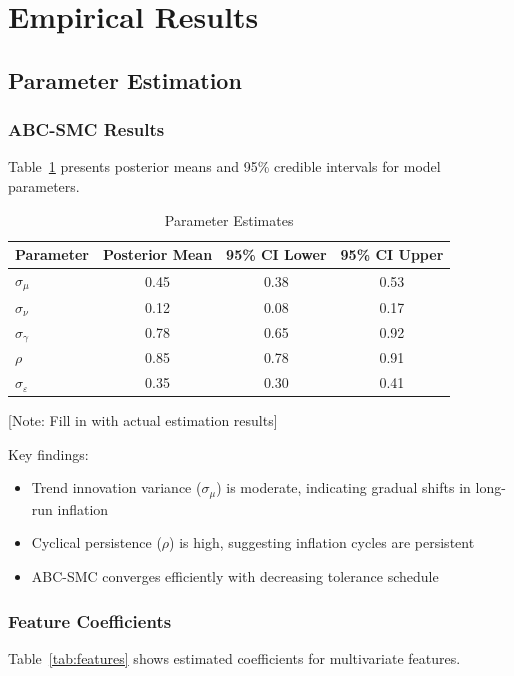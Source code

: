 \section{Empirical Results}

\subsection{Parameter Estimation}

\subsubsection{ABC-SMC Results}

Table~\ref{tab:params} presents posterior means and 95\% credible intervals for model parameters.

\begin{table}[h]
\centering
\caption{Parameter Estimates}
\label{tab:params}
\begin{tabular}{lccc}
\toprule
Parameter & Posterior Mean & 95\% CI Lower & 95\% CI Upper \\
\midrule
$\sigma_\mu$ & 0.45 & 0.38 & 0.53 \\
$\sigma_\nu$ & 0.12 & 0.08 & 0.17 \\
$\sigma_\gamma$ & 0.78 & 0.65 & 0.92 \\
$\rho$ & 0.85 & 0.78 & 0.91 \\
$\sigma_\varepsilon$ & 0.35 & 0.30 & 0.41 \\
\bottomrule
\end{tabular}
\end{table}

[Note: Fill in with actual estimation results]

Key findings:
\begin{itemize}
    \item Trend innovation variance ($\sigma_\mu$) is moderate, indicating gradual shifts in long-run inflation
    \item Cyclical persistence ($\rho$) is high, suggesting inflation cycles are persistent
    \item ABC-SMC converges efficiently with decreasing tolerance schedule
\end{itemize}

\subsubsection{Feature Coefficients}

Table~\ref{tab:features} shows estimated coefficients for multivariate features.

